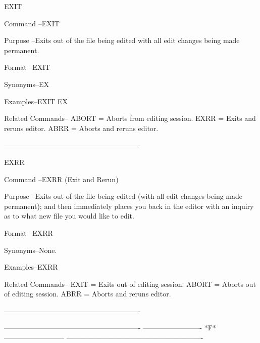 EXIT
 
Command --EXIT
 
Purpose --Exits out of the file being edited
          with all edit changes being made permanent.
 
Format  --EXIT
 
Synonyms--EX
 
Examples--EXIT
          EX
 
Related Commands--
          ABORT           = Aborts from editing session.
          EXRR            = Exits and reruns editor.
          ABRR            = Aborts and reruns editor.
 
----------------------------------------------------------
 
EXRR
 
Command --EXRR (Exit and Rerun)
 
Purpose --Exits out of the file being edited
          (with all edit changes being made permanent);
          and then immediately places you back
          in the editor with an inquiry as to
          what new file you would like to edit.
 
Format  --EXRR
 
Synonyms--None.
 
Examples--EXRR
 
Related Commands--
          EXIT            = Exits  out of editing session.
          ABORT           = Aborts out of editing session.
          ABRR            = Aborts and reruns editor.
 
----------------------------------------------------------
 
 
 
 
 
 
 
 
 
 
 
 
 
----------------------------------------------------------
-------------------------  *F*  --------------------------
----------------------------------------------------------
 
 
 
 
 
 
 
 
 
 
 
 
 
 
 
 
 
 
 
 
 
 
 
